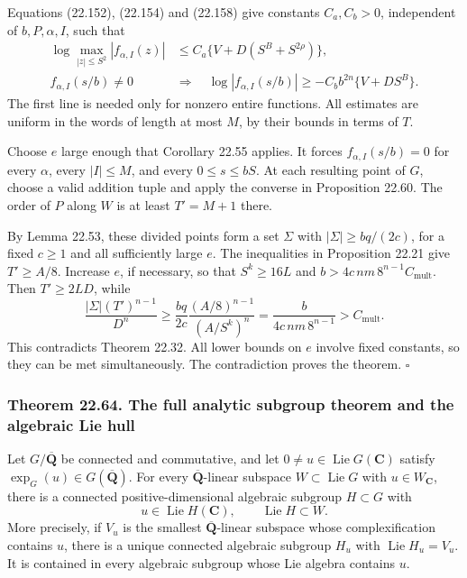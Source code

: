 \documentclass[
  11pt,
  a4paper,
]{article}
\begin{document}
Equations (22.152), (22.154) and (22.158) give constants \(C_a,C_b>0\),
independent of \(b,P,\alpha,I\), such that \[
\begin{split}
 \log\max_{|z|\le S^2}|f_{\alpha,I}(z)|
 &\le C_a\{V+D(S^B+S^{2\rho})\},\\
 f_{\alpha,I}(s/b)\ne0\quad&\Longrightarrow\quad
 \log|f_{\alpha,I}(s/b)|
 \ge-C_b b^{2n}\{V+DS^B\}.
\end{split}
\tag{22.161}
\] The first line is needed only for nonzero entire functions. All
estimates are uniform in the words of length at most \(M\), by their
bounds in terms of \(T\).

Choose \(e\) large enough that Corollary 22.55 applies. It forces
\(f_{\alpha,I}(s/b)=0\) for every \(\alpha\), every \(|I|\le M\), and
every \(0\le s\le bS\). At each resulting point of \(G\), choose a valid
addition tuple and apply the converse in Proposition 22.60. The order of
\(P\) along \(W\) is at least \(T'=M+1\) there.

By Lemma 22.53, these divided points form a set \(\Sigma\) with
\(|\Sigma|\ge bq/(2c)\), for a fixed \(c\ge1\) and all sufficiently
large \(e\). The inequalities in Proposition 22.21 give \(T'\ge A/8\).
Increase \(e\), if necessary, so that \(S^k\ge16L\) and
\(b>4c\,nm\,8^{n-1}C_{\mathrm{mult}}\). Then \(T'\ge2LD\), while \[
 \frac{|\Sigma|(T')^{n-1}}{D^n}
 \ge\frac{bq}{2c}\frac{(A/8)^{n-1}}{(A/S^k)^n}
 =\frac{b}{4c\,nm\,8^{n-1}}
 >C_{\mathrm{mult}}.
 \tag{22.162}
\] This contradicts Theorem 22.32. All lower bounds on \(e\) involve
fixed constants, so they can be met simultaneously. The contradiction
proves the theorem. \(\square\)

\subsubsection{Theorem 22.64. The full analytic subgroup theorem and the
algebraic Lie
hull}\label{theorem-22.64.-the-full-analytic-subgroup-theorem-and-the-algebraic-lie-hull}

Let \(G/\overline{\mathbf Q}\) be connected and commutative, and let
\(0\ne u\in\operatorname{Lie}G(\mathbf C)\) satisfy
\(\exp_G(u)\in G(\overline{\mathbf Q})\). For every
\(\overline{\mathbf Q}\)-linear subspace \(W\subset\operatorname{Lie}G\)
with \(u\in W_{\mathbf C}\), there is a connected positive-dimensional
algebraic subgroup \(H\subset G\) with \[
 u\in\operatorname{Lie}H(\mathbf C),\qquad
 \operatorname{Lie}H\subset W.
 \tag{22.163}
\] More precisely, if \(V_u\) is the smallest
\(\overline{\mathbf Q}\)-linear subspace whose complexification contains
\(u\), there is a unique connected algebraic subgroup \(H_u\) with
\(\operatorname{Lie}H_u=V_u\). It is contained in every algebraic
subgroup whose Lie algebra contains \(u\).
\end{document}
